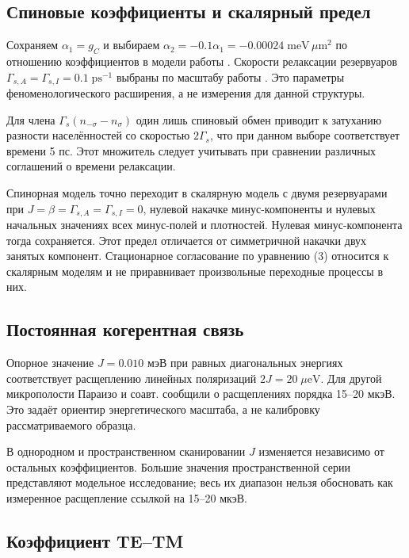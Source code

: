 \documentclass[12pt,a4paper]{article}
\begin{document}
\subsection{Спиновые коэффициенты и скалярный предел}

Сохраняем \(\alpha_1=g_C\) и выбираем \(\alpha_2=-0.1\alpha_1=-0.00024\;\mathrm{meV}\,\mu\mathrm m^2\) по отношению коэффициентов в модели работы \cite{ref4}. Скорости релаксации резервуаров \(\Gamma_{s,A}=\Gamma_{s,I}=0.1\;\mathrm{ps}^{-1}\) выбраны по масштабу работы \cite{ref3}. Это параметры феноменологического расширения, а не измерения для данной структуры.

Для члена \(\Gamma_s(n_{-\sigma}-n_\sigma)\) один лишь спиновый обмен приводит к затуханию разности населённостей со скоростью \(2\Gamma_s\), что при данном выборе соответствует времени 5 пс. Этот множитель следует учитывать при сравнении различных соглашений о времени релаксации.

Спинорная модель точно переходит в скалярную модель с двумя резервуарами при \(J=\beta=\Gamma_{s,A}=\Gamma_{s,I}=0\), нулевой накачке минус-компоненты и нулевых начальных значениях всех минус-полей и плотностей. Нулевая минус-компонента тогда сохраняется. Этот предел отличается от симметричной накачки двух занятых компонент. Стационарное согласование по уравнению (3) относится к скалярным моделям и не приравнивает произвольные переходные процессы в них.

\subsection{Постоянная когерентная связь}

Опорное значение \(J=0.010\) мэВ при равных диагональных энергиях соответствует расщеплению линейных поляризаций \(2J=20\;\mu\mathrm{eV}\). Для другой микрополости Параизо и соавт. \cite{ref5} сообщили о расщеплениях порядка 15--20 мкэВ. Это задаёт ориентир энергетического масштаба, а не калибровку рассматриваемого образца.

В однородном и пространственном сканировании \(J\) изменяется независимо от остальных коэффициентов. Большие значения пространственной серии представляют модельное исследование; весь их диапазон нельзя обосновать как измеренное расщепление ссылкой на 15--20 мкэВ.

\subsection{Коэффициент TE--TM}
\end{document}
